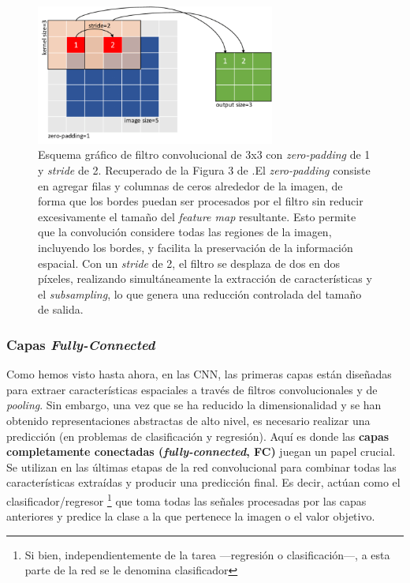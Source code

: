 \begin{figure}[htbp]
    \centering
    \includegraphics[width=0.7\textwidth]{capitulos/cap_02/imagenes/Example-of-a-square-image-convolution-with-zero-padding-While-training-a-CNN-there-are.png}
    \caption[
        Esquema gráfico de filtro convolucional de 3x3 con \textit{zero-padding} de 1 y \textit{stride} de 2.
        Recuperado de la Figura 3 de \cite{kiourt2020deep}.
    ]{
        Esquema gráfico de filtro convolucional de 3x3 con \textit{zero-padding} de 1 y \textit{stride} de 2.
        Recuperado de la Figura 3 de \cite{kiourt2020deep}.El \textit{zero-padding} consiste en agregar filas y columnas de ceros alrededor de la imagen, de forma que los bordes puedan ser procesados por el filtro sin reducir excesivamente el tamaño del \textit{feature map} resultante. Esto permite que la convolución considere todas las regiones de la imagen, incluyendo los bordes, y facilita la preservación de la información espacial. Con un \textit{stride} de 2, el filtro se desplaza de dos en dos píxeles, realizando simultáneamente la extracción de características y el \textit{subsampling}, lo que genera una reducción controlada del tamaño de salida.
    } 
    \label{fig:stride_example}
\end{figure}




\subsubsection{Capas \textit{Fully-Connected}}

Como hemos visto hasta ahora, en las \acrshort{CNN}, las primeras capas están diseñadas para extraer características espaciales a través de filtros convolucionales y de \textit{pooling}. Sin embargo, una vez que se ha reducido la dimensionalidad y se han obtenido representaciones abstractas de alto nivel, es necesario realizar una predicción (en problemas de clasificación y regresión). Aquí es donde las \textbf{capas completamente conectadas (\textit{fully-connected}, \acrshort{FC})} juegan un papel crucial. Se utilizan en las últimas etapas de la red convolucional para combinar todas las características extraídas y producir una predicción final. Es decir, actúan como el clasificador/regresor%
\footnote{
    Si bien, independientemente de la tarea ---regresión o clasificación---, a esta parte de la red se le 
    denomina clasificador
} 
que toma todas las señales procesadas por las capas anteriores y predice la clase a la que pertenece la imagen o el valor objetivo. 

